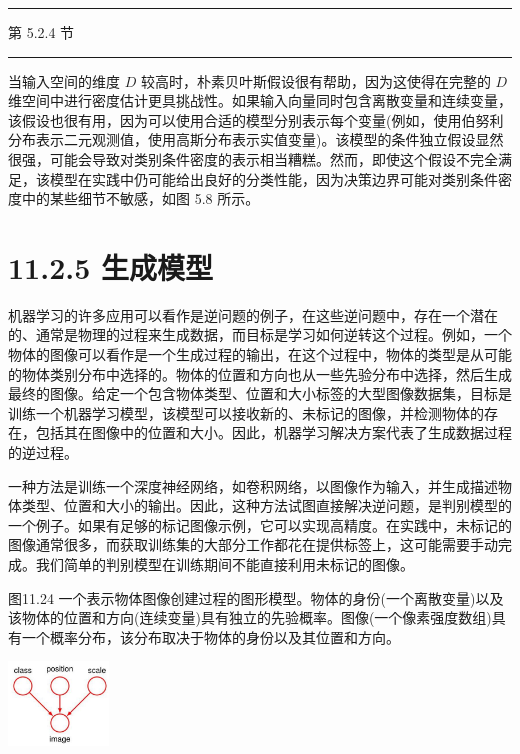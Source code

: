 \documentclass[10pt]{article}
\newcommand{\HRule}{\begin{center}\rule{0.9\linewidth}{0.2mm}\end{center}}
\begin{document}
\HRule

第 5.2.4 节

\HRule

当输入空间的维度 \(D\) 较高时，朴素贝叶斯假设很有帮助，因为这使得在完整的 \(D\) 维空间中进行密度估计更具挑战性。如果输入向量同时包含离散变量和连续变量，该假设也很有用，因为可以使用合适的模型分别表示每个变量(例如，使用伯努利分布表示二元观测值，使用高斯分布表示实值变量)。该模型的条件独立假设显然很强，可能会导致对类别条件密度的表示相当糟糕。然而，即使这个假设不完全满足，该模型在实践中仍可能给出良好的分类性能，因为决策边界可能对类别条件密度中的某些细节不敏感，如图 5.8 所示。

\section*{11.2.5 生成模型}

机器学习的许多应用可以看作是逆问题的例子，在这些逆问题中，存在一个潜在的、通常是物理的过程来生成数据，而目标是学习如何逆转这个过程。例如，一个物体的图像可以看作是一个生成过程的输出，在这个过程中，物体的类型是从可能的物体类别分布中选择的。物体的位置和方向也从一些先验分布中选择，然后生成最终的图像。给定一个包含物体类型、位置和大小标签的大型图像数据集，目标是训练一个机器学习模型，该模型可以接收新的、未标记的图像，并检测物体的存在，包括其在图像中的位置和大小。因此，机器学习解决方案代表了生成数据过程的逆过程。

一种方法是训练一个深度神经网络，如卷积网络，以图像作为输入，并生成描述物体类型、位置和大小的输出。因此，这种方法试图直接解决逆问题，是判别模型的一个例子。如果有足够的标记图像示例，它可以实现高精度。在实践中，未标记的图像通常很多，而获取训练集的大部分工作都花在提供标签上，这可能需要手动完成。我们简单的判别模型在训练期间不能直接利用未标记的图像。

图11.24 一个表示物体图像创建过程的图形模型。物体的身份(一个离散变量)以及该物体的位置和方向(连续变量)具有独立的先验概率。图像(一个像素强度数组)具有一个概率分布，该分布取决于物体的身份以及其位置和方向。

\begin{center}
\includegraphics[max width=0.2\textwidth]{images/0194e279-9b28-703a-88f4-c3ac21e2010d_366_1191_351_354_298_0.jpg}
\end{center}
\hspace*{3em} 
\end{document}
